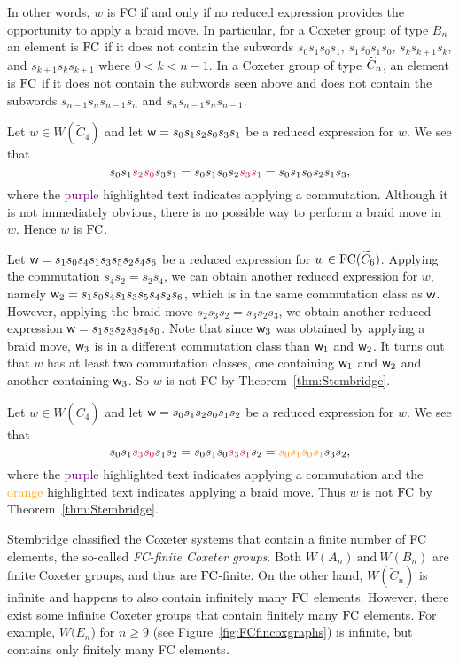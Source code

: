 In other words, $w$ is FC if and only if no reduced expression provides the opportunity to apply a braid move. In particular, for a Coxeter group of type $B_n$ an element is $\mathrm{FC}$ if it does not contain the subwords $s_0s_1s_0s_1$, $s_1s_0s_1s_0$, $s_ks_{k+1}s_k$, and $s_{k+1}s_ks_{k+1}$ where $0<k<n-1$. In a Coxeter group of type $\widetilde{C}_n$, an element is $\mathrm{FC}$ if it does not contain the subwords seen above and does not contain the subwords $s_{n-1}s_ns_{n-1}s_n$ and $s_{n}s_{n-1}s_ns_{n-1}$.

\begin{example}
	Let $w \in W(\widetilde{C}_4)$ and let $\mathsf{w}=s_0s_1s_2s_0s_3s_1$ be a reduced expression for $w$. We see that
	\[s_0s_1\textcolor{purple}{s_2s_0}s_3s_1=s_0s_1s_0s_2\textcolor{purple}{s_3s_1}=s_0s_1s_0s_2s_1s_3,\]
	where the \textcolor{purple}{purple} highlighted text indicates applying a commutation. Although it is not immediately obvious, there is no possible way to perform a braid move in $w$. Hence $w$ is $\mathrm{FC}$.
\end{example}

\begin{example}
Let $\mathsf{w}=s_1s_0s_4s_1s_3s_5s_2s_4s_6$ be a reduced expression for $w \in \mathrm{FC}(\widetilde{C}_6)$. Applying the commutation $s_4s_2=s_2s_4$, we can obtain another reduced expression for $w$, namely $\mathsf{w}_2=s_1s_0s_4s_1s_3s_5s_4s_2s_6$, which is in the same commutation class as $\mathsf{w}$. However, applying the braid move $s_2s_3s_2=s_3s_2s_3$, we obtain another reduced expression $\mathsf{w}=s_1s_3s_2s_3s_4s_0$. Note that since $\mathsf{w}_3$ was obtained by applying a braid move, $\mathsf{w}_3$ is in a different commutation class than $\mathsf{w}_1$ and $\mathsf{w}_2$. It turns out that $w$ has at least two commutation classes, one containing $\mathsf{w}_1$ and $\mathsf{w}_2$ and another containing $\mathsf{w}_3$. So $w$ is not FC by Theorem~\ref{thm:Stembridge}.
\end{example}

\begin{example}
Let $w \in W(\widetilde{C}_4)$ and let $\mathsf{w}=s_0s_1s_2s_0s_1s_2$ be a reduced expression for $w$. We see that
\[s_0s_1\textcolor{purple}{s_3s_0}s_1s_2=s_0s_1s_0\textcolor{purple}{s_3s_1}s_2=\textcolor{orange}{s_0s_1s_0s_1}s_3s_2,\]
where the \textcolor{purple}{purple} highlighted text indicates applying a commutation and the \textcolor{orange}{orange} highlighted text indicates applying a braid move. Thus $w$ is not $\mathrm{FC}$ by Theorem~\ref{thm:Stembridge}.  	
\end{example}

Stembridge classified the Coxeter systems that contain a finite number of FC elements, the so-called \emph{FC-finite Coxeter groups}. Both $W(A_n)~\mathrm{and}~W(B_n)$ are finite Coxeter groups, and thus are $\mathrm{FC}$-finite. On the other hand, $W(\widetilde{C}_n)$ is infinite and happens to also contain infinitely many $\mathrm{FC}$ elements. However, there exist some infinite Coxeter groups that contain finitely many $\mathrm{FC}$ elements. For example, $W(E_n$) for $n \geq 9$ (see Figure~\ref{fig:FCfincoxgraphs}) is infinite, but contains only finitely many FC elements.

